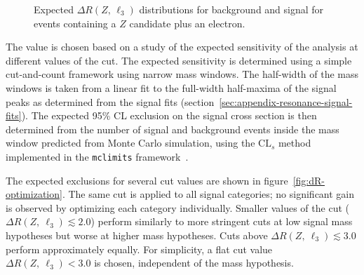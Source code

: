 \begin{itemize}
	\begin{figure}[htbp]
		\centering
		\caption{Expected $\Delta R(Z,\,\ell_3)$ distributions for background and signal for events containing a $Z$ candidate plus an electron.}
		\label{fig:resonance-inclusive-dR}
	\end{figure}

	The value is chosen based on a study of the expected sensitivity of the analysis at different values of the cut. The expected sensitivity is determined using a simple cut-and-count framework using narrow mass windows. The half-width of the mass windows is taken from a linear fit to the full-width half-maxima of the signal peaks as determined from the signal fits (section~\ref{sec:appendix-resonance-signal-fits}). The expected 95\% CL exclusion on the signal cross section is then determined from the number of signal and background events inside the mass window predicted from Monte Carlo simulation, using the $\mathrm{CL}_s$ method implemented in the \texttt{mclimits} framework~\cite{Junk:2007wq}. 

	The expected exclusions for several cut values are shown in figure~\ref{fig:dR-optimization}. The same cut is applied to all signal categories; no significant gain is observed by optimizing each category individually. Smaller values of the cut ($\Delta R(Z,\ \ell_3)\lesssim 2.0$) perform similarly to more stringent cuts at low signal mass hypotheses but worse at higher mass hypotheses. Cuts above $\Delta R(Z,\ \ell_3)\lesssim 3.0$ perform approximately equally. For simplicity, a flat cut value $\Delta R(Z,\ \ell_3)<3.0$ is chosen, independent of the mass hypothesis.



\end{itemize}
